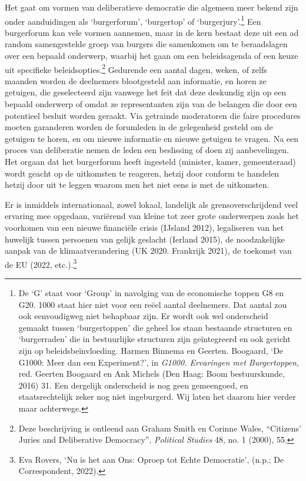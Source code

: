 \documentclass[smallauthor, chapterhaspagenum, nochapterinheader, pagenuminheader,  bigchapnum,medium2, tocpages,  garamond, titleinheader]{jote-book}
\begin{document}
	Het gaat om vormen van deliberatieve democratie die algemeen meer bekend zijn onder aanduidingen als ‘burgerforum', ‘burgertop' of ‘burgerjury'.\footnote{De ‘G' staat voor ‘Group' in navolging van de economische toppen G8 en G20. 1000 staat hier niet voor een reëel aantal deelnemers. Dat aantal zou ook eenvoudigweg niet behapbaar zijn. Er wordt ook wel onderscheid gemaakt tussen ‘burgertoppen' die geheel los staan bestaande structuren en ‘burgerraden' die in bestuurlijke structuren zijn geïntegreerd en ook gericht zijn op beleidsbeïnvloeding. Harmen Binnema en Geerten. Boogaard, ‘De G1000: Meer dan een Experiment?', in \emph{G1000. Ervaringen met Burgertoppen}, red. Geerten Boogaard en Ank Michels (Den Haag: Boom bestuurskunde, 2016) 31. Een dergelijk onderscheid is nog geen gemeengoed, en staatsrechtelijk zeker nog niet ingeburgerd. Wij laten het daarom hier verder maar achterwege.} Een burgerforum kan vele vormen aannemen, maar in de kern bestaat deze uit een ad random samengestelde groep van burgers die samenkomen om te beraadslagen over een bepaald onderwerp, waarbij het gaan om een beleidsagenda of een keuze uit specifieke beleidsopties.\footnote{Deze beschrijving is ontleend aan Graham Smith en Corinne Wales, “Citizens' Juries and Deliberative Democracy”, \emph{Political}\emph{ Studies} 48, no. 1 (2000), 55.} Gedurende een aantal dagen, weken, of zelfs maanden worden de deelnemers blootgesteld aan informatie, en horen ze getuigen, die geselecteerd zijn vanwege het feit dat deze deskundig zijn op een bepaald onderwerp of omdat ze representanten zijn van de belangen die door een potentieel besluit worden geraakt. Via getrainde moderatoren die faire procedures moeten garanderen worden de forumleden in de gelegenheid gesteld om de getuigen te horen, en om nieuwe informatie en nieuwe getuigen te vragen. Na een proces van deliberatie nemen de leden een beslissing of doen zij aanbevelingen. Het orgaan dat het burgerforum heeft ingesteld (minister, kamer, gemeenteraad) wordt geacht op de uitkomsten te reageren, hetzij door conform te handelen hetzij door uit te leggen waarom men het niet eens is met de uitkomsten.



	Er is inmiddels internationaal, zowel lokaal, landelijk als grensoverschrijdend veel ervaring mee opgedaan, variërend van kleine tot zeer grote onderwerpen zoals het voorkomen van een nieuwe financiële crisis (IJsland 2012), legaliseren van het huwelijk tussen persoenen van gelijk geslacht (Ierland 2015), de noodzakelijke aanpak van de klimaatverandering (UK 2020. Frankrijk 2021), de toekomst van de EU (2022, etc.).\footnote{Eva Rovers, ‘Nu is het aan Ons: Oproep tot Echte Democratie', (n.p.; De Correspondent, 2022).}
\end{document}

